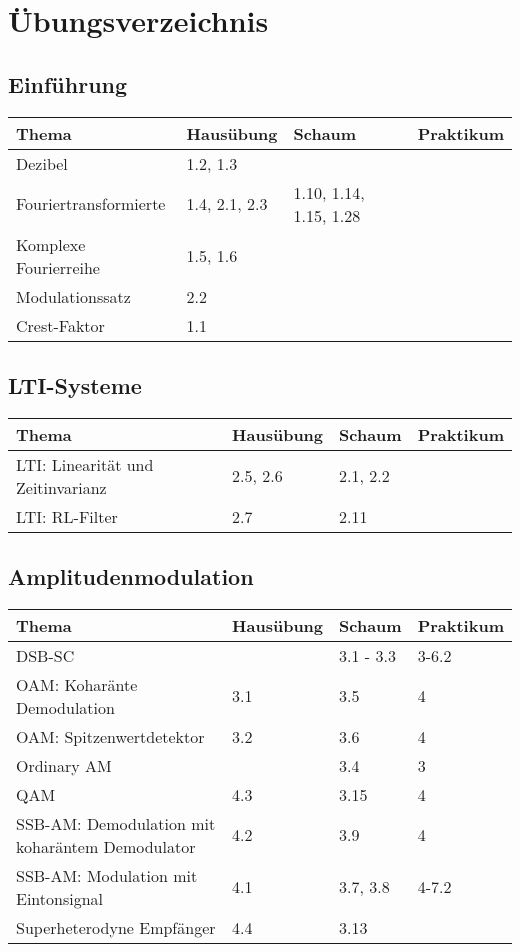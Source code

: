 \section{Übungsverzeichnis}

\subsection{Einführung}
	\begin{tabular}{|p{9cm}|p{2.5cm}|p{3.5cm}|p{2cm}|}
	\hline
	\textbf{Thema} & \textbf{Hausübung} & \textbf{Schaum} & \textbf{Praktikum} \\
	\hline
	Dezibel & 1.2, 1.3 &  &  \\
	\hline
	Fouriertransformierte & 1.4, 2.1, 2.3 & 1.10, 1.14, 1.15, 1.28 &  \\
	\hline
	Komplexe Fourierreihe & 1.5, 1.6 & & \\
	\hline
	Modulationssatz & 2.2 & & \\
	\hline
	Crest-Faktor & 1.1 & & \\
	\hline
	\end{tabular}

\subsection{LTI-Systeme}
	\begin{tabular}{|p{9cm}|p{2.5cm}|p{3.5cm}|p{2cm}|}
	\hline
	\textbf{Thema} & \textbf{Hausübung} & \textbf{Schaum} & \textbf{Praktikum} \\ \hline
	LTI: Linearität und Zeitinvarianz & 2.5, 2.6 & 2.1, 2.2 &  \\ \hline
	LTI: RL-Filter & 2.7 & 2.11 &  \\ \hline
	\end{tabular}

\subsection{Amplitudenmodulation}
	\begin{tabular}{|p{9cm}|p{2.5cm}|p{3.5cm}|p{2cm}|}
	\hline
	\textbf{Thema} & \textbf{Hausübung} & \textbf{Schaum} & \textbf{Praktikum} \\ \hline
	DSB-SC &  & 3.1 - 3.3 & 3-6.2 \\ \hline
	OAM: Koharänte Demodulation & 3.1 & 3.5 & 4 \\ \hline
	OAM: Spitzenwertdetektor & 3.2 & 3.6 & 4 \\ \hline
	Ordinary AM & & 3.4 & 3 \\ \hline
	QAM & 4.3  & 3.15 & 4 \\ \hline
	SSB-AM: Demodulation mit koharäntem Demodulator & 4.2 & 3.9 & 4 \\
	\hline SSB-AM: Modulation mit Eintonsignal & 4.1 & 3.7, 3.8 & 4-7.2 \\ \hline
	Superheterodyne Empfänger & 4.4 & 3.13 & \\
	\hline
	\end{tabular}

